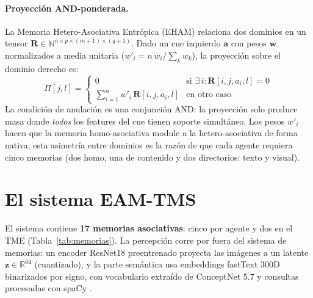 \documentclass[11pt]{article}
\begin{document}
\paragraph{Proyección AND-ponderada.}
La Memoria Hetero-Asociativa Entrópica (EHAM) \cite{morales2024hetero} relaciona
dos dominios en un tensor
$\mathbf{R} \in \mathbb{N}^{n \times p \times (m+1) \times (q+1)}$.
Dado un cue izquierdo $\mathbf{a}$ con pesos $\mathbf{w}$ normalizados a media
unitaria ($w'_i = n\, w_i / \sum_k w_k$), la proyección sobre el dominio derecho
es:
\begin{equation}
    \Pi[j, l] = \begin{cases}
        0 & \text{si } \exists\, i : \mathbf{R}[i, j, a_i, l] = 0 \\[4pt]
        \displaystyle\sum_{i=1}^{n} w'_i\, \mathbf{R}[i, j, a_i, l] & \text{en otro caso}
    \end{cases}
    \label{eq:proyeccion-AND}
\end{equation}
La condición de anulación es una conjunción AND: la proyección solo produce
masa donde \emph{todos} los features del cue tienen soporte simultáneo.
Los pesos $w'_i$ hacen que la memoria homo-asociativa module a la
hetero-asociativa de forma nativa; esta asimetría entre dominios es la razón de
que cada agente requiera cinco memorias (dos homo, una de contenido y dos
directorios: texto y visual).

\section{El sistema EAM-TMS}

El sistema contiene \textbf{17 memorias asociativas}: cinco por agente y dos
en el TME (Tabla~\ref{tab:memorias}).
La percepción corre por fuera del sistema de memorias: un encoder ResNet18
\cite{he2016resnet} preentrenado proyecta las imágenes a un latente
$\mathbf{z} \in \mathbb{R}^{64}$ (cuantizado), y la parte semántica usa
embeddings fastText 300D \cite{bojanowski2017fasttext} binarizados por signo,
con vocabulario extraído de ConceptNet 5.7 \cite{speer2017conceptnet} y
consultas procesadas con spaCy \cite{honnibal2020spacy}.
\end{document}
